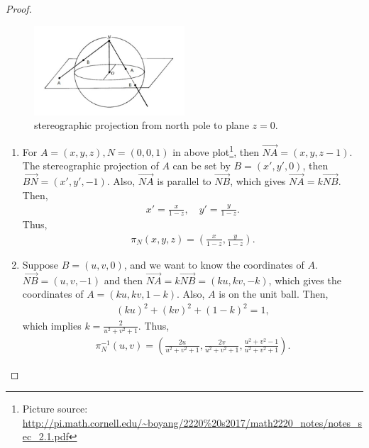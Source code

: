 \documentclass[11pt]{article}
\theoremstyle{definition}
\theoremstyle{definition}
\begin{document}
\begin{proof}
~\begin{figure}[H]
    \centering
    \includegraphics[width=0.5\textwidth]{p75}
    \caption{stereographic projection from north pole to plane $z = 0$.}
    \label{fig:plot_1}
\end{figure}
\begin{enumerate}[label=(\alph*)]
    \item For $A = (x,y,z), N = (0,0,1)$ in above plot\footnote{Picture source: \url{http://pi.math.cornell.edu/~boyang/2220\%20s2017/math2220_notes/notes_sec_2.1.pdf}}, then $\overrightarrow{NA} = (x,y,z-1)$. The stereographic projection of $A$ can be set by $B = (x',y',0)$, then $\overrightarrow{BN} = (x',y',-1)$. Also, $\overrightarrow{NA}$ is parallel to $\overrightarrow{NB}$, which gives $\overrightarrow{NA} = k \overrightarrow{NB}$. Then,
    \begin{align*}
        x' = \frac{x}{1-z},\quad y' = \frac{y}{1-z}.
    \end{align*}
    Thus,
    \begin{align*}
        \pi_N(x,y,z) = \left(\frac{x}{1-z}, \frac{y}{1-z}\right).
    \end{align*}
    
    \item Suppose $B = (u,v,0)$, and we want to know the coordinates of $A$. $\overrightarrow{NB} = (u,v,-1)$ and then $\overrightarrow{NA} = k \overrightarrow{NB} = (ku,kv,-k)$, which gives the coordinates of $A = (ku, kv, 1-k)$. Also, $A$ is on the unit ball. Then,
    \begin{align*}
        (ku)^2 + (kv)^2 + (1-k)^2 = 1,
    \end{align*}
    which implies $k = \frac{2}{u^2 + v^2 + 1}$. Thus, 
    \begin{align*}
        \pi^{-1}_N(u,v) = \left(\frac{2u}{u^2+v^2+1}, \frac{2v}{u^2+v^2+1}, \frac{u^2+v^2-1}{u^2+v^2+1}\right).
    \end{align*}
    

\end{enumerate}
\end{proof}
\end{document}
